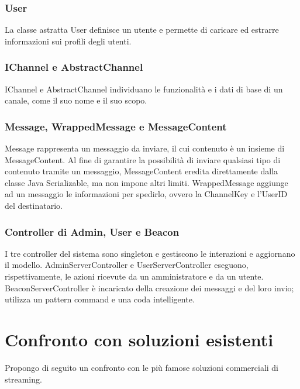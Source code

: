 		\subsubsection{User}
	La classe astratta User definisce un utente e permette di caricare ed estrarre informazioni sui profili degli utenti.

		\subsubsection{IChannel e AbstractChannel}
	IChannel e AbstractChannel individuano le funzionalità e i dati di base di un canale, come il suo nome e il suo scopo.

		\subsubsection{Message, WrappedMessage e MessageContent}
	Message rappresenta un messaggio da inviare, il cui contenuto è un insieme di MessageContent. Al fine di garantire la possibilità di inviare qualsiasi tipo di contenuto tramite un messaggio, MessageContent eredita direttamente dalla classe Java Serializable, ma non impone altri limiti. WrappedMessage aggiunge ad un messaggio le informazioni per spedirlo, ovvero la ChannelKey e l'UserID del destinatario.

		\subsubsection{Controller di Admin, User e Beacon}
	I tre controller del sistema sono singleton e gestiscono le interazioni e aggiornano il modello. AdminServerController e UserServerController eseguono, rispettivamente, le azioni ricevute da un amministratore e da un utente. BeaconServerController è incaricato della creazione dei messaggi e del loro invio; utilizza un pattern command e una coda intelligente.

\section{Confronto con soluzioni esistenti}
Propongo di seguito un confronto con le più famose soluzioni commerciali di streaming.

